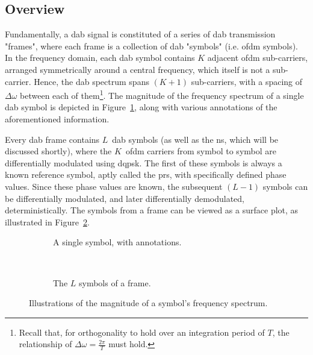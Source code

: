 \documentclass[class=report,11pt,crop=false]{standalone}
\begin{document}
\subsection{Overview}
Fundamentally, a \gls{dab} signal is constituted of a series of \gls{dab} transmission "frames", where each frame is a collection of \gls{dab} "symbols" (i.e. \gls{ofdm} symbols). In the frequency domain, each \gls{dab} symbol contains \(K\) adjacent \gls{ofdm} sub-carriers, arranged symmetrically around a central frequency, which itself is not a sub-carrier. Hence, the \gls{dab} spectrum spans \((K+1)\) sub-carriers, with a spacing of \(\Delta\omega\) between each of them\footnote{Recall that, for orthogonality to hold over an integration period of \(T\), the relationship of  \(\Delta\omega = \frac{2\pi}{T}\) must hold.}. The magnitude of the frequency spectrum of a single \gls{dab} symbol is depicted in Figure~\ref{fig:dab-single-symbol-diagram}, along with various annotations of the aforementioned information.

Every \gls{dab} frame contains \(L\)~\gls{dab} symbols (as well as the \gls{ns}, which will be discussed shortly), where the \(K\)~\gls{ofdm} carriers from symbol to symbol are differentially modulated using \gls{dqpsk}. The first of these symbols is always a known reference symbol, aptly called the \gls{prs}, with specifically defined phase values. Since these phase values are known, the subsequent \((L-1)\) symbols can be differentially modulated, and later differentially demodulated, deterministically. The symbols from a frame can be viewed as a surface plot, as illustrated in Figure~\ref{fig:dab-surface-diagram}.

\begin{figure}[htbp]
    \centering
    \captionsetup{type=figure}
    \begin{subfigure}[t]{0.47\textwidth}
        \centering
        \def\svgwidth{1\linewidth}
        {\scriptsize
            }
        \caption{A single  symbol, with annotations.}
        \label{fig:dab-single-symbol-diagram}
    \end{subfigure}%
    ~ 
    \begin{subfigure}[t]{0.52\textwidth}
        \def\svgwidth{1\linewidth}
        {\scriptsize
            }
        \caption{The \(L\) symbols of a  frame.}
        \label{fig:dab-surface-diagram}
    \end{subfigure}
    \caption{Illustrations of the magnitude of a  symbol's frequency spectrum.}
    \label{ig:dab-symbol-diagrams}
\end{figure}
\end{document}
